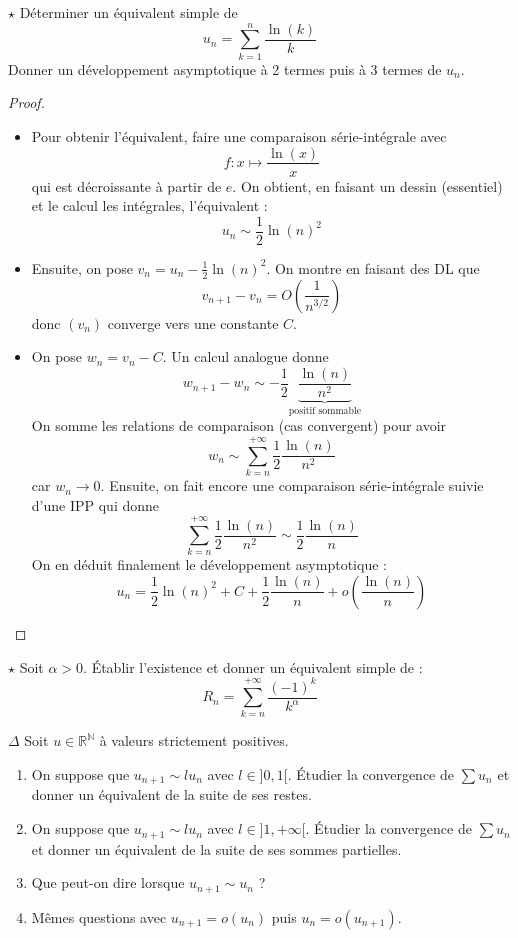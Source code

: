\documentclass[french,a4paper]{article}
\newcommand{\N}{\mathbb{N}}
\newcommand{\R}{\mathbb{R}}
\theoremstyle{plain}
\theoremstyle{definition}
\theoremstyle{remark}
\begin{document}
\begin{ex}[Moulin.49]{$\star$}
	Déterminer un équivalent simple de $$u_n=\sum_{k=1}^{n}\frac{\ln(k)}{k}$$ Donner un développement asymptotique à 2 termes puis à 3 termes de $u_n$.
\end{ex}
\begin{proof}
	\begin{itemize}
		\item Pour obtenir l'équivalent, faire une comparaison série-intégrale  avec $$f:x\mapsto\frac{\ln(x)}{x}$$ qui est décroissante à partir de $e$. On obtient, en faisant un dessin (essentiel) et le calcul les intégrales, l'équivalent : $$u_n\sim\frac{1}{2}\ln(n)^2$$
		\item  Ensuite, on pose $v_n=u_n-\displaystyle\frac{1}{2}\ln(n)^2$. On montre en faisant des DL que $$v_{n+1}-v_n=O\left(\frac{1}{n^{3/2}}\right)$$ donc $(v_n)$ converge vers une constante $C$.
		\item On pose $w_n=v_n-C$. Un calcul analogue donne $$w_{n+1}-w_n\sim-\frac{1}{2}\underbrace{\frac{\ln(n)}{n^2}}_{\text{positif sommable}}$$ On somme les relations de comparaison (cas convergent) pour avoir $$w_n\sim\sum_{k=n}^{+\infty}\frac{1}{2}\frac{\ln(n)}{n^2}$$ car $w_n\to 0$. Ensuite, on fait encore une comparaison série-intégrale suivie d'une IPP qui donne $$\sum_{k=n}^{+\infty}\frac{1}{2}\frac{\ln(n)}{n^2}\sim\frac{1}{2}\frac{\ln(n)}{n}$$ On en déduit finalement le développement asymptotique : $$u_n=\frac{1}{2}\ln(n)^2+C+\frac{1}{2}\frac{\ln(n)}{n}+o\left(\frac{\ln(n)}{n}\right)$$
	\end{itemize}
\end{proof}

\begin{ex}[Moulin.50]{$\star$}
	Soit $\alpha>0$. Établir l'existence et donner un équivalent simple de : $$R_n=\sum_{k=n}^{+\infty}\frac{(-1)^k}{k^\alpha}$$
\end{ex}

\begin{ex}[Moulin.51]{$\Delta$}
	Soit $u\in\R^\N$ à valeurs strictement positives.
	\begin{enumerate}
		\item On suppose que $u_{n+1}\sim l u_n$ avec $l\in]0,1[$. Étudier la convergence de $\sum u_n$ et donner un équivalent de la suite de ses restes.
		\item On suppose que $u_{n+1}\sim l u_n$ avec $l\in]1,+\infty[$. Étudier la convergence de $\sum u_n$ et donner un équivalent de la suite de ses sommes partielles.
		\item Que peut-on dire lorsque $u_{n+1}\sim u_n$ ?
		\item Mêmes questions avec $u_{n+1}=o(u_n)$ puis $u_n=o(u_{n+1})$.
	\end{enumerate}
\end{ex}
\end{document}
